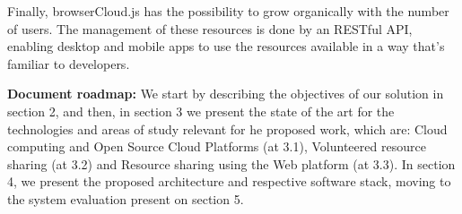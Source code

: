 Finally, browserCloud.js has the possibility to grow organically with the number of users. The management of these resources is done by an RESTful API, enabling desktop and mobile apps to use the resources available in a way that's familiar to developers. 


\textbf{Document roadmap:} We start by describing the objectives of our solution in section 2, and then, in section 3 we present the state of the art for the technologies and areas of study relevant for he proposed work, which are: Cloud computing and Open Source Cloud Platforms (at 3.1), Volunteered resource sharing (at 3.2) and Resource sharing using the Web platform (at 3.3). In section 4, we present the proposed architecture and respective software stack, moving to the system evaluation present on section 5.